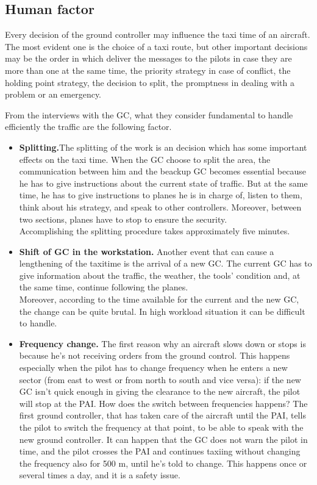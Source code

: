 \documentclass{article}
\begin{document}
\subsection{Human factor}
Every decision of the ground controller may influence the taxi time of an aircraft. The most evident one is the choice of a taxi route, but other important decisions may be the order in which deliver the messages to the pilots in case they are more than one at the same time, the priority strategy in case of conflict, the holding point strategy, the decision to split, the promptness in dealing with a problem or an emergency.

From the interviews with the GC, what they consider fundamental to handle efficiently the traffic are the following factor.
\begin{itemize}
\item \textbf{Splitting.}The splitting of the work is an decision which has some important effects on the taxi time. When the GC choose to split the area, the communication between him and the beackup GC becomes essential because he has to give instructions about the current state of traffic. But at the same time, he has to give instructions to planes he is in charge of, listen to them, think about his strategy, and speak to other controllers. Moreover, between two sections, planes have to stop to ensure the security.
\\
Accomplishing the splitting procedure takes approximately five minutes.

\item \textbf{Shift of GC in the workstation.}
Another event that can cause a lengthening of the taxitime is the arrival of a new GC. The current GC has to give information about the traffic, the weather, the tools' condition and, at the same time, continue following the planes.\\
Moreover, according to the time available for the current and the new GC, the change can be quite brutal. In high workload situation it can be difficult to handle.

\item \textbf{Frequency change.}
The first reason why an aircraft slows down or stops is because he's not receiving orders from the ground control. This happens especially when the pilot has to change frequency when he enters a new sector (from east to west or from north to south and vice versa): if the new GC isn't quick enough in giving the clearance to the new aircraft, the pilot will stop at the PAI.
How does the switch between frequencies happens? The first ground controller, that has taken care of the aircraft until the PAI, tells the pilot to switch the frequency at that point, to be able to speak with the new ground controller. It can happen that the GC does not warn the pilot in time, and the pilot crosses the PAI and continues taxiing without changing the frequency also for 500 m, until he's told to change. This happens once or several times a day, and it is a safety issue.


\end{itemize}
\end{document}
